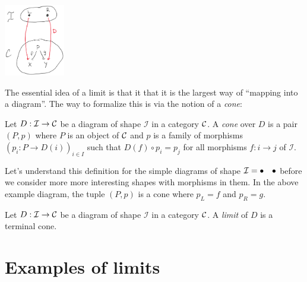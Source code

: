 \begin{center}
  \includegraphics[width=100px]{fig/diagram-1.png}
\end{center}

The essential idea of a limit is that it that it is the largest way of ``mapping 
into a diagram''. 
The way to formalize this is via the notion of a \emph{cone}:

\begin{definition}[Cone]
  \sloppy
  Let \(D : \mathcal I \to \mathcal C\) be a diagram of shape \(\mathcal I\)
  in a category \(\mathcal C\).
  A \emph{cone} over \(D\) is a pair \((P,p)\)
  where \(P\) is an object of \(\mathcal C\)
  and \(p\) is a family of morphisms \((p_i : P \to D(i))_{i\in I}\)
  such that \(D(f) \circ p_i = p_j\) for all morphisms \(f : i \to j\)
  of \(\mathcal I\).
\end{definition}

Let's understand this definition for the simple diagrams of shape $\mathcal I =
\bullet \quad \bullet$ before we consider more more interesting shapes with
morphisms in them. In the above example diagram, the tuple $(P, p)$
is a cone where $p_L = f$ and $p_R = g$.


\begin{definition}[Limit]
  Let \(D : \mathcal I \to \mathcal C\) be a diagram of shape \(\mathcal I\)
  in a category \(\mathcal C\).
  A \emph{limit} of \(D\) is a terminal cone.
\end{definition}



\section{Examples of limits}

